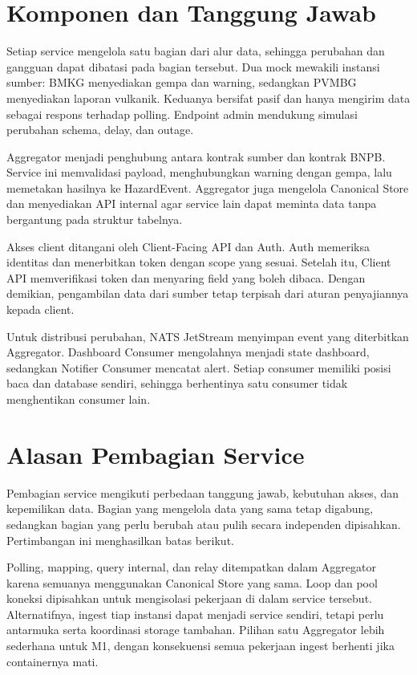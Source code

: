 \section{Komponen dan Tanggung Jawab}
Setiap service mengelola satu bagian dari alur data, sehingga perubahan dan gangguan dapat dibatasi pada bagian tersebut. Dua mock mewakili instansi sumber: BMKG menyediakan gempa dan warning, sedangkan PVMBG menyediakan laporan vulkanik. Keduanya bersifat pasif dan hanya mengirim data sebagai respons terhadap polling. Endpoint admin mendukung simulasi perubahan schema, delay, dan outage.

Aggregator menjadi penghubung antara kontrak sumber dan kontrak BNPB. Service ini memvalidasi payload, menghubungkan warning dengan gempa, lalu memetakan hasilnya ke HazardEvent. Aggregator juga mengelola Canonical Store dan menyediakan API internal agar service lain dapat meminta data tanpa bergantung pada struktur tabelnya.

Akses client ditangani oleh Client-Facing API dan Auth. Auth memeriksa identitas dan menerbitkan token dengan scope yang sesuai. Setelah itu, Client API memverifikasi token dan menyaring field yang boleh dibaca. Dengan demikian, pengambilan data dari sumber tetap terpisah dari aturan penyajiannya kepada client.

Untuk distribusi perubahan, NATS JetStream menyimpan event yang diterbitkan Aggregator. Dashboard Consumer mengolahnya menjadi state dashboard, sedangkan Notifier Consumer mencatat alert. Setiap consumer memiliki posisi baca dan database sendiri, sehingga berhentinya satu consumer tidak menghentikan consumer lain.

\section{Alasan Pembagian Service}
Pembagian service mengikuti perbedaan tanggung jawab, kebutuhan akses, dan kepemilikan data. Bagian yang mengelola data yang sama tetap digabung, sedangkan bagian yang perlu berubah atau pulih secara independen dipisahkan. Pertimbangan ini menghasilkan batas berikut.

Polling, mapping, query internal, dan relay ditempatkan dalam Aggregator karena semuanya menggunakan Canonical Store yang sama. Loop dan pool koneksi dipisahkan untuk mengisolasi pekerjaan di dalam service tersebut. Alternatifnya, ingest tiap instansi dapat menjadi service sendiri, tetapi perlu antarmuka serta koordinasi storage tambahan. Pilihan satu Aggregator lebih sederhana untuk M1, dengan konsekuensi semua pekerjaan ingest berhenti jika containernya mati.

